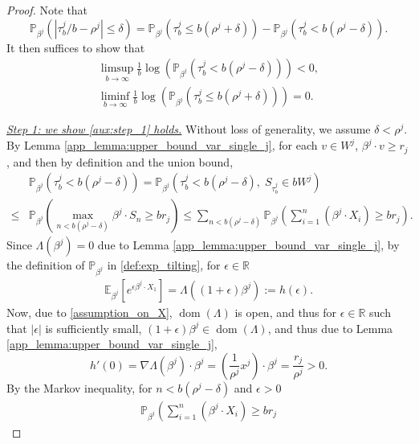 \documentclass[aap,preprint]{imsart}
\newcommand{\Pro}{{\mathbb{P}}}
\newcommand{\Exp}{{\mathbb{E}}}
\newcommand{\bR}{{\mathbb{R}}}
\theoremstyle{plain}
\theoremstyle{definition}
\begin{document}
\begin{appendix}
\begin{proof}
Note that 
$$\Pro_{\beta^j}\left( \left|\tau_b^j/b - \rho^j\right| \leq  \delta \right) =
\Pro_{\beta^j}\left( \tau_b^j \leq  b(\rho^j+\delta) \right) 
-
\Pro_{\beta^j}\left( \tau_b^j < b(\rho^j-\delta) \right).
$$
It then suffices to show that
\begin{align}
    \limsup_{b \to \infty} \frac{1}{b} \log\left( \Pro_{\beta^j}\left( \tau_b^j < b(\rho^j-\delta) \right) \right) < 0, \label{aux:step_1} \\
        \liminf_{b \to \infty} \frac{1}{b} \log\left( \Pro_{\beta^j}\left( \tau_b^j \leq b(\rho^j+\delta) \right) \right) = 0. \label{aux:step_2}
\end{align}

\noindent \underline{\textit{Step 1: we show \eqref{aux:step_1} holds.}} Without loss of generality, we assume $\delta < \rho^j$. 
By Lemma \ref{app_lemma:upper_bound_var_single_j}, for each $v \in W^j$, $\beta^j \cdot v \geq r_j$, and then by definition and the union bound,
\begin{align*}
    &\Pro_{\beta^j}\left(\tau_b^j < b (\rho^j - \delta) \right) = 
    \Pro_{\beta^j}\left(\tau_b^j <  b (\rho^j - \delta),\; S_{\tau_b^j} \in b W^j \right) \\
    \leq &
    \Pro_{\beta^j}\left( 
    \max_{n  <  b(\rho^j-\delta)} \beta^j \cdot S_n \geq b r_j
    \right) \leq \sum_{n < b(\rho^j - \delta)}
    \Pro_{\beta^j}\left( 
 \sum_{i=1}^{n} \left(\beta^j \cdot X_i \right) \geq b r_j
    \right).
\end{align*}
Since $\Lambda(\beta^j) = 0$ due to Lemma \ref{app_lemma:upper_bound_var_single_j}, by the definition of $\Pro_{\beta^j}$ in \eqref{def:exp_tilting}, for $\epsilon \in \bR$
\begin{align*}
    \Exp_{\beta^j} \left[ e^{\epsilon \beta^j \cdot X_1} \right] =  \Lambda((1+\epsilon)\beta^j) := h(\epsilon).
\end{align*}
Now, due to \eqref{assumption_on_X}, $\operatorname{dom}(\Lambda)$ is open, and thus for $\epsilon \in \bR$ such that $|\epsilon|$ is sufficiently small, $(1+\epsilon) \beta^j \in \operatorname{dom}(\Lambda)$, and thus due to Lemma \ref{app_lemma:upper_bound_var_single_j},
$$
h'(0) = \nabla \Lambda(\beta^j) \cdot \beta^j = \left(\frac{1}{\rho^j} x^j \right) \cdot \beta^j = \frac{r_j}{\rho^j} > 0.
$$
By the Markov inequality, for $n <  b(\rho^j -\delta)$ and  $\epsilon > 0$
\begin{align*}
\Pro_{\beta^j}\left( 
 \sum_{i=1}^{n} \left(\beta^j \cdot X_i \right) \geq b r_j

\end{align*}
\end{proof}
\end{appendix}
\end{document}
